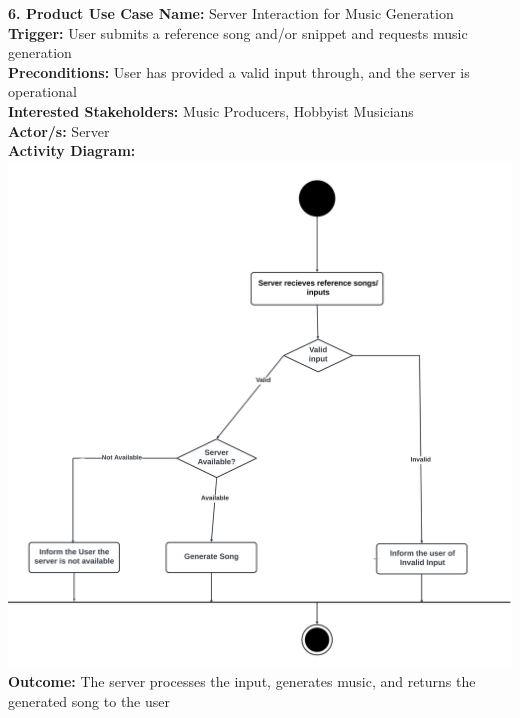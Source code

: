 \documentclass[12pt]{article}
\begin{document}
\textbf{6. Product Use Case Name:} Server Interaction for Music Generation \\
\textbf{Trigger:} User submits a reference song and/or snippet and requests music generation \\
\textbf{Preconditions:} User has provided a valid input through, and the server is operational \\
\textbf{Interested Stakeholders:} Music Producers, Hobbyist Musicians \\
\textbf{Actor/s:} Server \\
\textbf{Activity Diagram:} \\
\includegraphics[width=\textwidth]{server_song_gen.png} \\
\textbf{Outcome:} The server processes the input, generates music, and returns the generated song to the user

\vspace{1cm}
\end{document}

